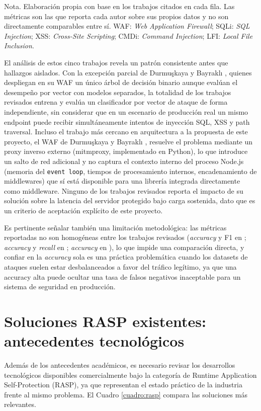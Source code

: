 {\footnotesize Nota. Elaboración propia con base en los trabajos citados en cada fila. Las métricas son las que reporta cada autor sobre sus propios datos y no son directamente comparables entre sí. WAF: \textit{Web Application Firewall}; SQLi: \textit{SQL Injection}; XSS: \textit{Cross-Site Scripting}; CMDi: \textit{Command Injection}; LFI: \textit{Local File Inclusion}.}

El análisis de estos cinco trabajos revela un patrón consistente antes que hallazgos aislados. Con la excepción parcial de Durmuşkaya y Bayraklı \cite{durmuskaya2025waf}, quienes despliegan en su
WAF un único árbol de decisión binario aunque evalúan el desempeño por vector con modelos separados,
la totalidad de los trabajos revisados entrena y evalúa un clasificador por vector de ataque de forma
independiente, sin considerar que en un escenario de producción real un mismo endpoint puede
recibir simultáneamente intentos de inyección SQL, XSS y path traversal. Incluso el trabajo más cercano en arquitectura a la propuesta de este proyecto, el WAF de Durmuşkaya
y Bayraklı \cite{durmuskaya2025waf}, resuelve el problema mediante un proxy inverso externo
(mitmproxy, implementado en Python), lo que introduce un
salto de red adicional y no captura el contexto interno del proceso Node.js (memoria del \texttt{event
loop}, tiempos de procesamiento internos, encadenamiento de middlewares) que sí está disponible
para una librería integrada directamente como middleware. Ninguno de los trabajos revisados
reporta el impacto de su solución sobre la latencia del servidor protegido bajo carga sostenida, dato
que es un criterio de aceptación explícito de este proyecto.

Es pertinente señalar también una limitación metodológica: las métricas reportadas no son homogéneas entre los trabajos revisados (\textit{accuracy} y F1 en
\cite{peralta2024sql}; \textit{accuracy} y \textit{recall} en \cite{seyyar2024}; \textit{accuracy} en \cite{durmuskaya2025waf}), lo que impide una comparación directa, y confiar en la
\textit{accuracy} sola es una práctica problemática cuando los datasets de ataques suelen
estar desbalanceados a favor del tráfico legítimo, ya que una accuracy alta puede ocultar una tasa
de falsos negativos inaceptable para un sistema de seguridad en producción.

\section{Soluciones RASP existentes: antecedentes tecnológicos}
\label{sec:rasp-antecedentes}
\label{sec:rasp-existentes}
Además de los antecedentes académicos, es necesario revisar los desarrollos tecnológicos
disponibles comercialmente bajo la categoría de Runtime Application Self-Protection (RASP), ya
que representan el estado práctico de la industria frente al mismo problema. El Cuadro
\ref{cuadro:rasp} compara las soluciones más relevantes.

